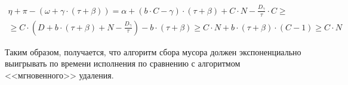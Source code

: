 \begin{multline}
    \eta + \pi - \left(\omega + \gamma \cdot \left(\tau + \beta\right)\right) =
    \alpha + \left(b \cdot C - \gamma\right) \cdot (\tau + \beta) + C \cdot N - \frac{D_{\gamma}}{\tau} \cdot C \geq \\
    \geq C \cdot \left(D + b \cdot (\tau + \beta) + N - \frac{D_{\gamma}}{\tau}\right) - b \cdot \left(\tau + \beta\right) \geq
    C \cdot N + b \cdot \left(\tau + \beta\right) \cdot (C - 1) \geq C \cdot N
\end{multline}

Таким образом, получается, что алгоритм сбора мусора должен экспоненциально
выигрывать по времени исполнения по сравнению с алгоритмом <<мгновенного>> удаления.

